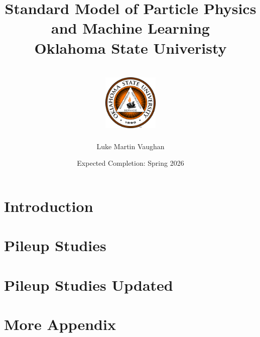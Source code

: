 \documentclass[12pt]{report}
\title{
  {Standard Model of Particle Physics\\ and Machine Learning}\\
  {\large Oklahoma State Univeristy}\\
  {\hfill}\\
  {\includegraphics[width=0.2\textwidth]{Oklahoma_State_University_seal.png}}
}
\author{Luke Martin Vaughan}
\date{Expected Completion: Spring 2026}
\begin{document}
\maketitle

\tableofcontents

%

%

%

%

\chapter{Introduction}


\appendix
\chapter{Pileup Studies}


\chapter{Pileup Studies Updated}


\chapter{More Appendix}

\end{document}
